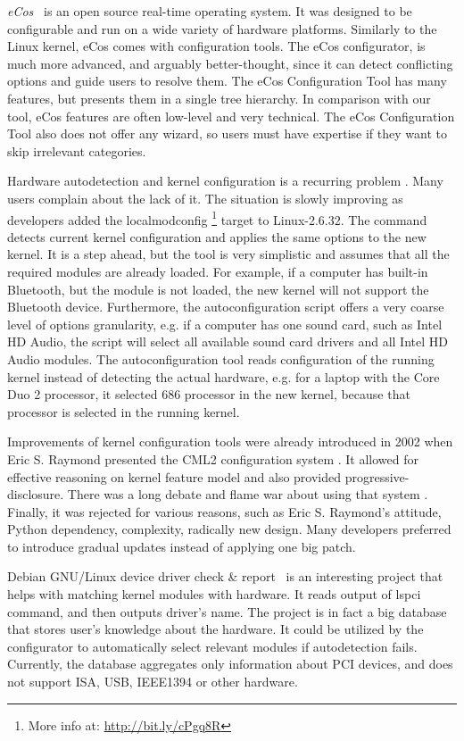\documentclass{chi2009}
\begin{document}
\textit{eCos}~\cite{veer:ecos:2000} is an open source real-time operating system. It was designed to be configurable and run on a wide variety of hardware platforms. Similarly to the Linux kernel, eCos comes with configuration tools. The eCos configurator, is much more advanced, and arguably better-thought, since it can detect conflicting options and guide users to resolve them. The eCos Configuration Tool has many features, but presents them in a single tree hierarchy. In comparison with our tool, eCos features are often low-level and very technical. The eCos Configuration Tool also does not offer any wizard, so users must have expertise if they want to skip irrelevant categories.

Hardware autodetection and kernel configuration is a recurring problem \cite{debian:config:2010,soft32:config:2007}. Many users complain about the lack of it. The situation is slowly improving as developers added the \textsf{localmodconfig} \footnote{More info at: \url{http://bit.ly/cPgq8R}} target to Linux-2.6.32. The command detects current kernel configuration and applies the same options to the new kernel. It is a step ahead, but the tool is very simplistic and assumes that all the required modules are already loaded. For example, if a computer has built-in Bluetooth, but the module is not loaded, the new kernel will not support the Bluetooth device. Furthermore, the autoconfiguration script offers a very coarse level of options granularity, e.g. if a computer has one sound card, such as Intel HD Audio, the script will select all available sound card drivers and all Intel HD Audio modules. The autoconfiguration tool reads configuration of the running kernel instead of detecting the actual hardware, e.g. for a laptop with the Core Duo 2 processor, it selected 686 processor in the new kernel, because that processor is selected in the running kernel.

Improvements of kernel configuration tools were already introduced in 2002 when Eric S. Raymond presented the CML2 configuration system \cite{raymond:cml2:2000}. It allowed for effective reasoning on kernel feature model and also provided progressive-disclosure. There was a long debate and flame war about using that system \cite{kerneltrap:linux:2002}. Finally, it was rejected for various reasons, such as Eric S. Raymond's attitude, Python dependency, complexity, radically new design. Many developers preferred to introduce gradual updates instead of applying one big patch.

Debian GNU/Linux device driver check \& report~\cite{muto:check:2010} is an interesting project that helps with matching kernel modules with hardware. It reads output of \textsf{lspci} command, and then outputs driver's name. The project is in fact a big database that stores user's knowledge about the hardware. It could be utilized by the configurator to automatically select relevant modules if autodetection fails. Currently, the database aggregates only information about PCI devices, and does not support ISA, USB, IEEE1394 or other hardware.
\end{document}
